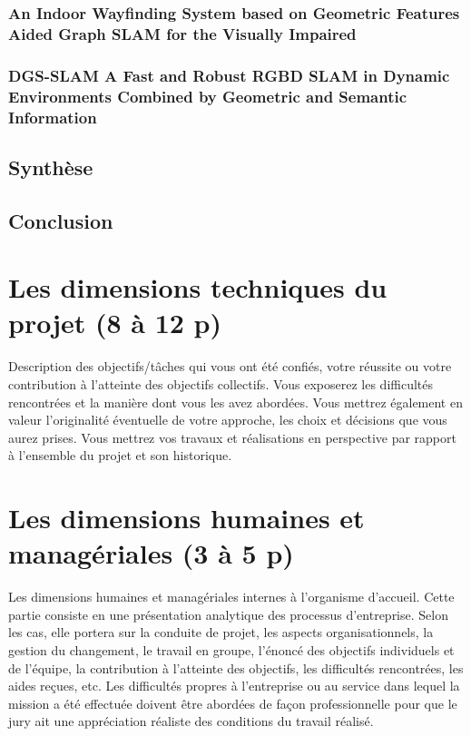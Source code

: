 \documentclass[11pt]{article}
\begin{document}
  \subsubsection{An Indoor Wayfinding System based on Geometric Features Aided
  Graph SLAM for the Visually Impaired}  

  \pagebreak
  
  \subsubsection{DGS-SLAM A Fast and Robust RGBD SLAM in Dynamic Environments
  Combined by Geometric and Semantic Information}

  \pagebreak


  \subsection{Synthèse}

  \pagebreak

  \subsection{Conclusion}

  \pagebreak
  \section{Les dimensions techniques du projet (8 à 12 p)}
  Description des objectifs/tâches qui vous ont été confiés, votre réussite ou votre contribution à
  l’atteinte des objectifs collectifs. Vous exposerez les difficultés rencontrées et la manière dont vous
  les avez abordées. Vous mettrez également en valeur l’originalité éventuelle de votre approche, les
  choix et décisions que vous aurez prises. Vous mettrez vos travaux et réalisations en perspective par
  rapport à l’ensemble du projet et son historique.

  \pagebreak
  \section{Les dimensions humaines et managériales (3 à 5 p)}
  Les dimensions humaines et managériales internes à l’organisme d’accueil. Cette partie consiste en
  une présentation analytique des processus d’entreprise. Selon les cas, elle portera sur la conduite de
  projet, les aspects organisationnels, la gestion du changement, le travail en groupe, l’énoncé des
  objectifs individuels et de l’équipe, la contribution à l’atteinte des objectifs, les difficultés rencontrées,
  les aides reçues, etc. Les difficultés propres à l’entreprise ou au service dans lequel la mission a été
  effectuée doivent être abordées de façon professionnelle pour que le jury ait une appréciation réaliste
  des conditions du travail réalisé.  
\end{document}
